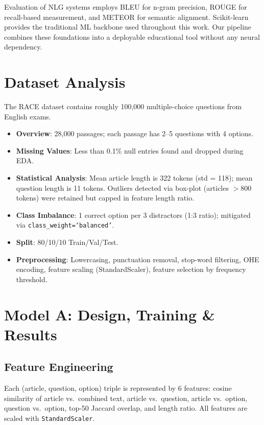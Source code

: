 \documentclass[10pt,twocolumn]{article}
\begin{document}
Evaluation of NLG systems employs BLEU \cite{bleu} for n-gram precision, ROUGE \cite{rouge} for recall-based measurement, and METEOR \cite{meteor} for semantic alignment. Scikit-learn \cite{sklearn} provides the traditional ML backbone used throughout this work. Our pipeline combines these foundations into a deployable educational tool without any neural dependency.

\section{Dataset Analysis}
The RACE dataset contains roughly 100,000 multiple-choice questions from English exams.
\begin{itemize}
    \item \textbf{Overview}: 28,000 passages; each passage has 2--5 questions with 4 options.
    \item \textbf{Missing Values}: Less than 0.1\% null entries found and dropped during EDA.
    \item \textbf{Statistical Analysis}: Mean article length is 322 tokens (std = 118); mean question length is 11 tokens. Outliers detected via box-plot (articles $>800$ tokens) were retained but capped in feature length ratio.
    \item \textbf{Class Imbalance}: 1 correct option per 3 distractors (1:3 ratio); mitigated via \texttt{class\_weight=`balanced'}.
    \item \textbf{Split}: 80/10/10 Train/Val/Test.
    \item \textbf{Preprocessing}: Lowercasing, punctuation removal, stop-word filtering, OHE encoding, feature scaling (StandardScaler), feature selection by frequency threshold.
\end{itemize}

\section{Model A: Design, Training \& Results}

\subsection*{Feature Engineering}
Each (article, question, option) triple is represented by 6 features: cosine similarity of article vs.\ combined text, article vs.\ question, article vs.\ option, question vs.\ option, top-50 Jaccard overlap, and length ratio. All features are scaled with \texttt{StandardScaler}.
\end{document}
